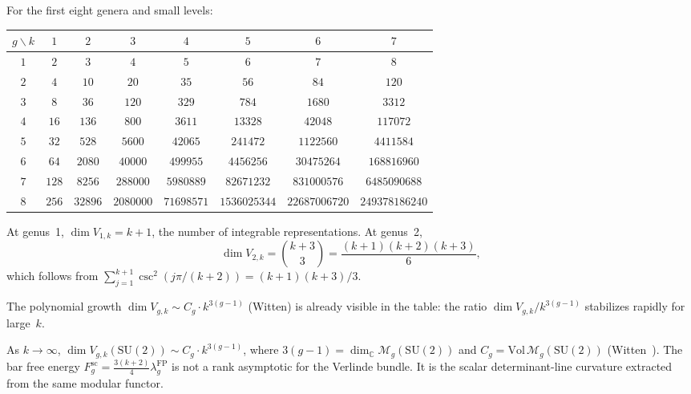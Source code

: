 \begin{computation}\label{comp:verlinde-sl2}
For the first eight genera and small levels:

\medskip
\begin{center}
\renewcommand{\arraystretch}{1.3}
{\small
\begin{tabular}{cccccccc}
\toprule
$g \backslash k$ & $1$ & $2$ & $3$ & $4$ & $5$ & $6$ & $7$ \\
\midrule
$1$ & $2$ & $3$ & $4$ & $5$ & $6$ & $7$ & $8$ \\
$2$ & $4$ & $10$ & $20$ & $35$ & $56$ & $84$ & $120$ \\
$3$ & $8$ & $36$ & $120$ & $329$ & $784$ & $1680$ & $3312$ \\
$4$ & $16$ & $136$ & $800$ & $3611$ & $13328$ & $42048$ & $117072$ \\
%
$5$ & $32$ & $528$ & $5600$ & $42065$ & $241472$ & $1122560$ & $4411584$ \\
$6$ & $64$ & $2080$ & $40000$ & $499955$ & $4456256$ & $30475264$ & $168816960$ \\
$7$ & $128$ & $8256$ & $288000$ & $5980889$ & $82671232$ & $831000576$ & $6485090688$ \\
$8$ & $256$ & $32896$ & $2080000$ & $71698571$ & $1536025344$ & $22687006720$ & $249378186240$ \\
\bottomrule
\end{tabular}
}
\end{center}
\medskip

At genus~1, $\dim V_{1,k} = k+1$, the number of integrable
representations. At genus~2,
\[
\dim V_{2,k} = \binom{k+3}{3} = \frac{(k+1)(k+2)(k+3)}{6},
\]
which follows from
$\sum_{j=1}^{k+1} \csc^2(j\pi/(k+2)) = (k+1)(k+3)/3$.

The polynomial growth
$\dim V_{g,k} \sim C_g \cdot k^{3(g-1)}$ \textup{(}Witten\textup{)}
is already visible in the table: the ratio
$\dim V_{g,k}/k^{3(g-1)}$ stabilizes rapidly for large~$k$.
\end{computation}

\begin{remark}\label{rem:verlinde-asymptotics}

As $k \to \infty$, $\dim V_{g,k}(\mathrm{SU}(2)) \sim C_g \cdot k^{3(g-1)}$, where $3(g-1) = \dim_\mathbb{C} \mathcal{M}_g(\mathrm{SU}(2))$ and $C_g = \mathrm{Vol}\,\mathcal{M}_g(\mathrm{SU}(2))$ (Witten~\cite{Witten91}). The bar free energy
$F_g^{\mathrm{sc}} = \frac{3(k+2)}{4}\lambda_g^{\mathrm{FP}}$ is not a
rank asymptotic for the Verlinde bundle. It is the scalar
determinant-line curvature extracted from the same modular functor.
\end{remark}

